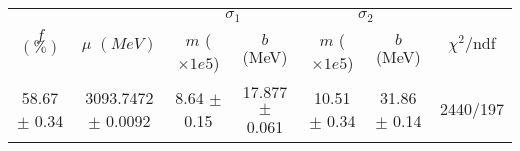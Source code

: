 \begin{tabular}{c|c|cc|cc||c}
 \multirow{2}{*}{$f$ $(\%)$} & \multirow{2}{*}{$\mu$ $(MeV)$} & \multicolumn{2}{|c|}{$\sigma_1$} & \multicolumn{2}{|c||}{$\sigma_2$} & \multirow{2}{*}{$\chi^2/$ndf} \\
 & & $m$ ($\times1e5$) & $b$ (MeV) & $m$ ($\times1e5$) & $b$ (MeV) & \\
\hline
58.67 $\pm$ 0.34 & 3093.7472 $\pm$ 0.0092 & 8.64 $\pm$ 0.15 & 17.877 $\pm$ 0.061 & 10.51 $\pm$ 0.34 & 31.86 $\pm$ 0.14 & 2440/197\\
\end{tabular}
